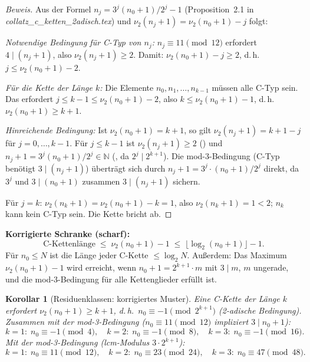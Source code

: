 \documentclass[12pt,a4paper]{article}
\newtheorem{korollar}[definition]{Korollar}
\newenvironment{beweis}{\begin{proof}[Beweis]}{\end{proof}}
\newcommand{\vii}{\nu_2}
\newcommand{\N}{\mathbb{N}}
\begin{document}
	\begin{beweis}
		Aus der Formel $n_j = 3^j(n_0+1)/2^j - 1$ (Proposition~2.1 in
		\textit{collatz\_c\_ketten\_2adisch.tex}) und $\vii(n_j+1) = \vii(n_0+1) - j$
		folgt:
		
		\textit{Notwendige Bedingung für C-Typ von $n_j$:} $n_j \equiv 11 \pmod{12}$
		erfordert $4 \mid (n_j+1)$, also $\vii(n_j+1) \geq 2$.
		Damit: $\vii(n_0+1) - j \geq 2$, d.\,h.\ $j \leq \vii(n_0+1) - 2$.
		
		\textit{Für die Kette der Länge $k$:} Die Elemente $n_0, n_1, \ldots, n_{k-1}$
		müssen alle C-Typ sein. Das erfordert $j \leq k-1 \leq \vii(n_0+1) - 2$,
		also $k \leq \vii(n_0+1) - 1$, d.\,h.\ $\vii(n_0+1) \geq k+1$.
		
		\textit{Hinreichende Bedingung:} Ist $\vii(n_0+1) = k+1$, so gilt
		$\vii(n_j+1) = k+1 - j$ für $j = 0, \ldots, k-1$.
		Für $j \leq k-1$ ist $\vii(n_j+1) \geq 2$ (\checkmark) und
		$n_j+1 = 3^j(n_0+1)/2^j \in \N$ (\checkmark, da $2^j \mid 2^{k+1}$).
		Die mod-3-Bedingung (C-Typ benötigt $3 \mid (n_j+1)$) überträgt sich durch
		$n_j+1 = 3^j \cdot (n_0+1)/2^j$ direkt, da $3^j$ und $3 \mid (n_0+1)$
		zusammen $3 \mid (n_j+1)$ sichern.
		
		Für $j = k$: $\vii(n_k+1) = \vii(n_0+1) - k = 1$, also $\vii(n_k+1) = 1 < 2$;
		$n_k$ kann kein C-Typ sein. Die Kette bricht ab. \qedhere
	\end{beweis}
	
	\begin{tcolorbox}[ergebnis]
		\textbf{Korrigierte Schranke (scharf):}
		\[
		\text{C-Kettenlänge} \;\leq\; \vii(n_0+1) - 1 \;\leq\; \lfloor\log_2(n_0+1)\rfloor - 1.
		\]
		Für $n_0 \leq N$ ist die Länge jeder C-Kette $\leq \log_2 N$.
		Außerdem: Das Maximum $\vii(n_0+1) - 1$ wird erreicht, wenn
		$n_0+1 = 2^{k+1} \cdot m$ mit $3 \mid m$, $m$ ungerade, und die
		mod-3-Bedingung für alle Kettenglieder erfüllt ist.
	\end{tcolorbox}
	
	\begin{korollar}[Residuenklassen: korrigiertes Muster]
		\label{kor:muster-korr}
		Eine C-Kette der Länge $k$ erfordert $\vii(n_0+1) \geq k+1$, d.\,h.\
		$n_0 \equiv -1 \pmod{2^{k+1}}$ (2-adische Bedingung). Zusammen mit der
		mod-3-Bedingung ($n_0 \equiv 11 \pmod{12}$ impliziert $3 \mid n_0+1$):
		\[
		k=1\colon\; n_0 \equiv -1 \pmod{4},\quad
		k=2\colon\; n_0 \equiv -1 \pmod{8},\quad
		k=3\colon\; n_0 \equiv -1 \pmod{16}.
		\]
		Mit der mod-3-Bedingung (lcm-Modulus $3 \cdot 2^{k+1}$):
		\[
		k=1\colon\; n_0 \equiv 11 \pmod{12},\quad
		k=2\colon\; n_0 \equiv 23 \pmod{24},\quad
		k=3\colon\; n_0 \equiv 47 \pmod{48}.
		\]
	\end{korollar}
	
\end{document}
